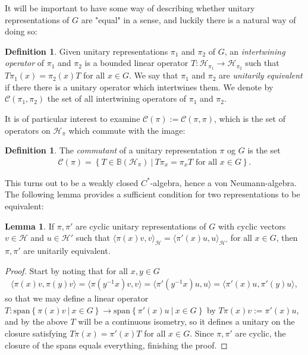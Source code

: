 \documentclass[10pt,twoside,openany,final]{memoir}
\theoremstyle{definition}
\newtheorem{lemma}[theorem]{Lemma}
\newtheorem{definition}[theorem]{Definition}
\theoremstyle{Break}
\renewcommand{\H}{\mathcal{H}}
\begin{document}
It will be important to have some way of describing whether unitary representations of $G$ are "equal" in a sense, and luckily there is a natural way of doing so:
\begin{definition}
	Given unitary representations $\pi_1$ and $\pi_2$ of $G$, an \emph{intertwining operator}  of $\pi_1$ and $\pi_2$ is a bounded linear operator $T \colon \H_{\pi_1} \to \H_{\pi_2}$ such that $T\pi_{1}(x) = \pi_2(x) T$ for all $x \in G$. We say that $\pi_1$ and $\pi_2$ are \emph{unitarily equivalent} if there there is a unitary operator which intertwines them. We denote by $\mathcal{C}(\pi_1,\pi_2)$ the set of all intertwining operators of $\pi_1$ and $\pi_2$.
\end{definition}
It is of particular interest to examine $\mathcal{C}(\pi):=\mathcal{C}(\pi,\pi)$, which is the set of operators on $\H_\pi$ which commute with the image:
\begin{definition}
The \emph{commutant} of a unitary representation $\pi$ og $G$ is the set 
\begin{align*}
	\mathcal{C}(\pi)=\left\{ T \in \mathbb{B}(\H_\pi) \ | \ T\pi_x=\pi_xT \text{ for all } x \in G \right\}.
\end{align*}
\end{definition}
This turns out to be a weakly closed $C^*$-algebra, hence a von Neumann-algebra. The following lemma provides a sufficient condition for two representations to be equivalent:
\begin{lemma}
	If $\pi,\pi'$ are cyclic unitary representations of $G$ with cyclic vectors $v \in \H$ and $u\in\H'$ such that $\langle \pi(x) v , v \rangle_\H=\langle \pi'(x)u,u\rangle_{\H'}$ for all $x \in G$, then $\pi,\pi'$ are unitarily equivalent.
	\label{3.23}
\end{lemma}
\begin{proof}
	Start by noting that for all $x,y \in G$ 
	\begin{align*}
		\langle \pi(x) v , \pi(y) v \rangle= \langle \pi(y^{-1}x) v , v \rangle = \langle \pi'(y^{-1}x) u,u\rangle=\langle \pi'(x) u,\pi'(y) u \rangle,
	\end{align*}
	so that we may define a linear operator $T \colon \mathrm{span} \left\{ \pi(x) v  \ | \ x \in G \right\} \to \mathrm{span}\left\{ \pi'(x) u  \ | \ x \in G \right\}$ by $T\pi(x)v:=\pi'(x)u$, and by the above $T$ will be a continuous isometry, so it defines a unitary on the closure satisfying $T\pi(x)=\pi'(x)T$ for all $x \in G$. Since $\pi,\pi'$ are cyclic, the closure of the spans equals everything, finishing the proof.
\end{proof}
\end{document}
